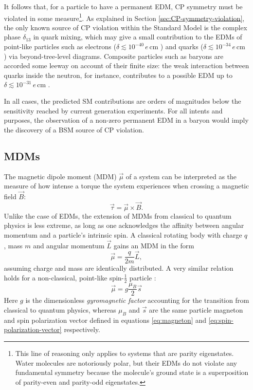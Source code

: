It follows that, for a particle to have a permanent EDM, CP symmetry must be violated in some measure\footnote{This line of reasoning only applies to systems that are parity eigenstates. Water molecules are notoriously polar, but their EDMs do not violate any fundamental symmetry because the molecule's ground state is a superposition of parity-even and parity-odd eigenstates.}.
As explained in Section \ref{sec:CP-symmetry-violation}, the only known source of CP violation within the Standard Model is the complex phase $\delta_{13}$ in quark mixing, which may give a small contribution to the EDMs of point-like particles such as electrons ($\delta \lesssim {10}^{-40}\,e\,\text{cm}$ \cite{electronEDM}) and quarks ($\delta \lesssim {10}^{-34} \,e\,\text{cm}$ \cite{quarkEDM}) via beyond-tree-level diagrams. Composite particles such as baryons are accorded some leeway on account of their finite size:
the weak interaction between quarks inside the neutron, for instance, contributes to a possible EDM up to $\delta \lesssim {10}^{-31}\,e\,\text{cm}$ \cite{neutronEDM}.

In all cases, the predicted SM contributions are orders of magnitudes below the sensitivity reached by current generation experiments.
For all intents and purposes, the observation of a non-zero permanent EDM in a baryon would imply the discovery of a BSM source of CP violation.

\subsection{MDMs}
The magnetic dipole moment (MDM) $\vec{\mu}$ of a system can be interpreted as the measure of how intense a torque the system experiences when crossing a magnetic field $\vec{B}$:
\begin{equation}
\vec{\tau} = \vec{\mu} \times \vec{B}.
\end{equation}
Unlike the case of EDMs, the extension of MDMs from classical to quantum physics is less extreme, as long as one acknowledges the affinity between angular momentum and a particle's intrinsic spin.
A classical rotating body with charge $q$, mass $m$ and angular momentum $\vec{L}$ gains an MDM in the form
\begin{equation}
	\vec{\mu} = \frac{q}{2m} \vec{L},
\end{equation}
assuming charge and mass are identically distributed.
A very similar relation holds for a non-classical, point-like spin-$\frac{1}{2}$ particle \cite{searchNewPhysics}:
\begin{equation}
	\vec{\mu} = g \frac{\mu_B}{2} \vec{s} 
\end{equation}
Here $g$ is the dimensionless \textit{gyromagnetic factor} accounting for the transition from classical to quantum physics, whereas $\mu_B$ and $\vec{s}$ are the same particle magneton and spin polarization vector defined in equations \eqref{eq:magneton} and \eqref{eq:spin-polarization-vector} respectively.

